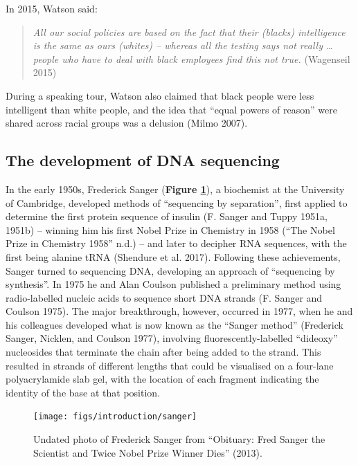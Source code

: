 \documentclass[
]{book}
\begin{document}
In 2015, Watson said:

\begin{quote}
\emph{All our social policies are based on the fact that their (blacks) intelligence is the same as ours (whites) -- whereas all the testing says not really \ldots{} people who have to deal with black employees find this not true.} (Wagenseil 2015)
\end{quote}

During a speaking tour, Watson also claimed that black people were less intelligent than white people, and the idea that ``equal powers of reason'' were shared across racial groups was a delusion (Milmo 2007).

\hypertarget{the-development-of-dna-sequencing}{%
\subsection{The development of DNA sequencing}\label{the-development-of-dna-sequencing}}

In the early 1950s, Frederick Sanger (\textbf{Figure \ref{fig:sanger}}), a biochemist at the University of Cambridge, developed methods of ``sequencing by separation'', first applied to determine the first protein sequence of insulin (F. Sanger and Tuppy 1951a, 1951b) -- winning him his first Nobel Prize in Chemistry in 1958 ({``The {Nobel Prize} in {Chemistry} 1958''} n.d.) -- and later to decipher RNA sequences, with the first being alanine tRNA (Shendure et al. 2017). Following these achievements, Sanger turned to sequencing DNA, developing an approach of ``sequencing by synthesis''. In 1975 he and Alan Coulson published a preliminary method using radio-labelled nucleic acids to sequence short DNA strands (F. Sanger and Coulson 1975). The major breakthrough, however, occurred in 1977, when he and his colleagues developed what is now known as the ``Sanger method'' (Frederick Sanger, Nicklen, and Coulson 1977), involving fluorescently-labelled ``dideoxy'' nucleosides that terminate the chain after being added to the strand. This resulted in strands of different lengths that could be visualised on a four-lane polyacrylamide slab gel, with the location of each fragment indicating the identity of the base at that position.



\begin{figure}

{\centering \texttt{[image: figs/introduction/sanger]} 

}

\caption{Undated photo of Frederick Sanger from {``Obituary: {Fred Sanger} the Scientist and Twice {Nobel Prize} Winner Dies''} (2013).}\label{fig:sanger}
\end{figure}
\end{document}
